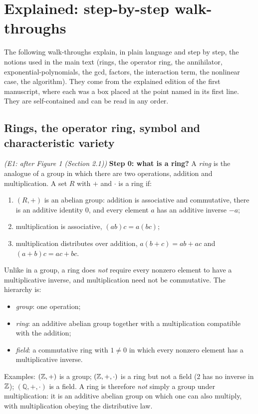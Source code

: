 \section{Explained: step-by-step walk-throughs}\label{app:explained}
\noindent The following walk-throughs explain, in plain language and step by step, the notions used in the main text (rings, the operator ring, the annihilator, exponential-polynomials, the gcd, factors, the interaction term, the nonlinear case, the algorithm). They come from the explained edition of the first manuscript, where each was a box placed at the point named in its first line. They are self-contained and can be read in any order.

\subsection{Rings, the operator ring, symbol and characteristic variety}\label{expl:E1}
\noindent\emph{(E1: after Figure 1 (Section 2.1))}
\textbf{Step 0: what is a ring?} A \emph{ring} is the analogue of a group in which there are two operations, addition and multiplication. A set $R$ with $+$ and $\cdot$ is a ring if:
\begin{enumerate}[nosep]
\item $(R,+)$ is an abelian group: addition is associative and commutative, there is an additive identity $0$, and every element $a$ has an additive inverse $-a$;
\item multiplication is associative, $(ab)c=a(bc)$;
\item multiplication distributes over addition, $a(b+c)=ab+ac$ and $(a+b)c=ac+bc$.
\end{enumerate}
Unlike in a group, a ring does \emph{not} require every nonzero element to have a multiplicative inverse, and multiplication need not be commutative. The hierarchy is:
\begin{itemize}[nosep]
\item \emph{group}: one operation;
\item \emph{ring}: an additive abelian group together with a multiplication compatible with the addition;
\item \emph{field}: a commutative ring with $1\ne0$ in which every nonzero element has a multiplicative inverse.
\end{itemize}
Examples: $(\mathbb{Z},+)$ is a group; $(\mathbb{Z},+,\cdot)$ is a ring but not a field (2 has no inverse in $\mathbb{Z}$); $(\mathbb Q,+,\cdot)$ is a field. A ring is therefore \emph{not} simply a group under multiplication: it is an additive abelian group on which one can also multiply, with multiplication obeying the distributive law.

